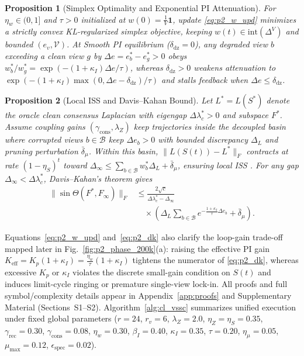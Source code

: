 \documentclass[journal]{IEEEtran}
\newtheorem{proposition}{Proposition}
\begin{document}
\begin{proposition}[Simplex Optimality and Exponential PI Attenuation]
For $\eta_w \in (0, 1]$ and $\tau > 0$ initialized at $w(0) = \frac{1}{V}\mathbf{1}$, update \eqref{eq:p2_w_upd} minimizes a strictly convex KL-regularized simplex objective, keeping $w(t) \in \mathrm{int}(\Delta^V)$ and bounded $(e_v, \mathcal{V})$. At Smooth PI equilibrium ($\delta_{\mathrm{dz}} = 0$), any degraded view $b$ exceeding a clean view $g$ by $\Delta e = e_b^* - e_g^* > 0$ obeys $w_b^*/w_g^* = \exp(-(1+\kappa_I)\Delta e / \tau)$, whereas $\delta_{\mathrm{dz}} > 0$ weakens attenuation to $\exp(-(1+\kappa_I)\max(0,\Delta e - \delta_{\mathrm{dz}})/\tau)$ and stalls feedback when $\Delta e \le \delta_{\mathrm{dz}}$.
\end{proposition}

\begin{proposition}[Local ISS and Davis--Kahan Bound]
Let $L^* = L(S^*)$ denote the oracle clean consensus Laplacian with eigengap $\Delta\lambda_c^* > 0$ and subspace $F^*$. Assume coupling gains $(\gamma_{\mathrm{cons}}, \lambda_Z)$ keep trajectories inside the decoupled basin where corrupted views $b \in \mathcal{B}$ keep $\Delta e_b > 0$ with bounded discrepancy $\Delta_L$ and pruning perturbation $\bar{\delta}_\mu$. Within this basin, $\|L(S(t)) - L^*\|_F$ contracts at rate $(1-\eta_S)^t$ toward $\Delta_\infty \le \sum_{b \in \mathcal{B}} w_b^* \Delta_L + \bar{\delta}_\mu$, ensuring local ISS \cite{sontag2008iss}. For any gap $\Delta_\infty < \Delta\lambda_c^*$, Davis--Kahan's theorem \cite{davis1970rotation} gives
\begin{equation}
\begin{aligned}
\|\sin\Theta(F^*, F_\infty)\|_F &\le \frac{2\sqrt{c}}{\Delta\lambda_c^* - \Delta_\infty} \\
&\quad \times \left(\Delta_L \sum_{b \in \mathcal{B}} e^{-\frac{1+\kappa_I}{\tau}\Delta e_b} + \bar{\delta}_\mu\right).
\end{aligned}
\label{eq:p2_dk}
\end{equation}
\end{proposition}

Equations~\eqref{eq:p2_w_upd} and~\eqref{eq:p2_dk} also clarify the loop-gain trade-off mapped later in Fig.~\ref{fig:p2_phase_200k}(a): raising the effective PI gain $K_{\mathrm{eff}} = K_p(1 + \kappa_I) = \frac{\eta_w}{\tau}(1+\kappa_I)$ tightens the numerator of \eqref{eq:p2_dk}, whereas excessive $K_p$ or $\kappa_I$ violates the discrete small-gain condition on $S(t)$ and induces limit-cycle ringing or premature single-view lock-in. All proofs and full symbol/complexity details appear in Appendix~\ref{app:proofs} and Supplementary Material (Sections~S1--S2). Algorithm~\ref{alg:cl_vssc} summarizes unified execution under fixed global parameters ($r=24$, $r_v=6$, $\lambda_Z=2.0$, $\eta_Z=\eta_S=0.35$, $\gamma_{\mathrm{rec}}=0.30$, $\gamma_{\mathrm{cons}}=0.08$, $\eta_w=0.30$, $\beta_I=0.40$, $\kappa_I=0.35$, $\tau=0.20$, $\eta_\mu=0.05$, $\mu_{\max}=0.12$, $\epsilon_{\mathrm{spec}}=0.02$).
\end{document}
